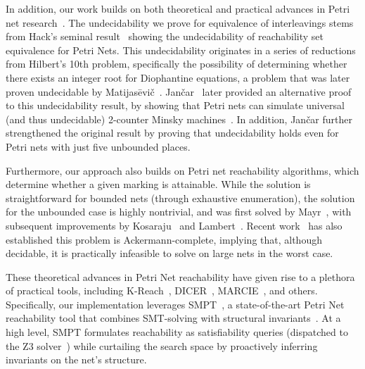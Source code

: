 In addition, our work builds on both theoretical and practical advances in Petri net research~\cite{Mu89, Es96, Re12, EsNi24}. The undecidability we prove for equivalence of interleavings stems from Hack’s seminal result~\cite{Ha76, HaThesis76} showing the undecidability of reachability set equivalence for Petri Nets. This undecidability originates in a series of reductions from Hilbert’s 10th problem, specifically the possibility of determining whether there exists an integer root for Diophantine equations, a problem that was later proven undecidable by Matijasēvič~\cite{Ma70}.
%
Jančar~\cite{Ja95} later provided an alternative proof to this undecidability result, by showing that Petri nets can simulate universal (and thus undecidable) 2-counter Minsky machines~\cite{Mi67}. In addition, Jančar further strengthened the original result by proving that undecidability holds even for Petri nets with just five unbounded places.

Furthermore, our approach also builds on Petri net reachability algorithms, which determine whether a given marking is attainable. While the solution is straightforward for bounded nets (through exhaustive enumeration), the solution for the unbounded case is highly nontrivial, and was first solved by Mayr~\cite{Ma81}, with subsequent improvements by Kosaraju~\cite{Ko82} and Lambert~\cite{La92}. Recent work~\cite{CzWo22} has also established this problem is Ackermann-complete, implying that, although decidable, it is practically infeasible to solve on large nets in the worst case.

These theoretical advances in Petri Net reachability have given rise to a plethora of practical tools, including K-Reach~\cite{DiLa20}, DICER~\cite{XiZhLi21}, MARCIE~\cite{HeRoSc13}, and others. 
%
Specifically, our implementation leverages SMPT~\cite{AmDa23}, a state-of-the-art Petri Net reachability tool that combines SMT-solving with structural invariants~\cite{AmBeDa21, AmDaHu22}. At a high level, SMPT formulates reachability as satisfiability queries (dispatched to the Z3 solver~\cite{DeBj08}) while curtailing the search space by proactively inferring invariants on the net's structure.
%


 
 







